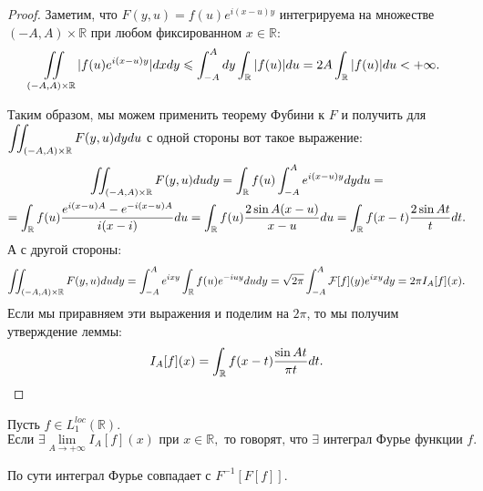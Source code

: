 \begin{proof}

Заметим, что $F(y, u) = f(u)e^{i(x-u)y}$ интегрируема на множестве $(-A, A) \times \mathbb{R}$ при любом фиксированном $x \in \mathbb{R}$:
\[
    \iint\limits_{(-A, A) \times \mathbb{R}} |f(u)e^{i(x - u)y}|dxdy \leqslant \int_{-A}^{A}dy \int_{\mathbb{R}}|f(u)|du = 2A \int_{\mathbb{R}} |f(u)|du < +\infty.
\]


Таким образом, мы можем применить теорему Фубини к $F$ и получить для $\displaystyle \iint_{(-A, A) \times \mathbb{R}} F(y, u)dydu$ с одной стороны вот такое выражение:
\begin{multline*}
    \iint_{(-A, A) \times \mathbb{R}} F(y, u) du dy = \int_{\mathbb{R}} f(u) \int_{-A}^{A} e^{i(x - u)y}dy du = \\ =
    \int_{\mathbb{R}} f(u) \dfrac{e^{i(x - u)A} - e^{-i(x - u)A}}{i(x - i)}du = \int_{\mathbb{R}} f(u) \dfrac{2 \sin A(x - u)}{x - u}du = \int_{\mathbb{R}} f(x - t) \dfrac{2 \sin At}{t}dt.
\end{multline*}
А с другой стороны:
\begin{equation*}
    \iint_{(-A, A) \times \mathbb{R}} F(y, u) du dy = \int_{-A}^{A} e^{ixy} \int_{\mathbb{R}} f(u) e^{-iuy}du dy = \sqrt {2\pi} \int_{-A}^{A} \mathcal{F}[f](y) e^{ixy} dy = 2\pi I_A[f](x).
\end{equation*}
Если мы приравняем эти выражения и поделим на $2\pi$, то мы получим утверждение леммы:
\[
    I_{A}[f](x) = \int_{\mathbb{R}} f(x - t) \dfrac{\sin At}{\pi t}dt.
\]
\end{proof}

\begin{definition}
    Пусть $f \in L_1^{loc}(\mathbb{R})$.
\[
\text{Если } \exists \lim_{A \to +\infty} I_A[f](x) \text{ при } x \in \mathbb{R}, \text{ то говорят, что $\exists$ интеграл Фурье функции } f. 
\]

\begin{remark}
    По сути интеграл Фурье совпадает с $F^{-1}[F[f]].$
\end{remark}
\end{definition}

